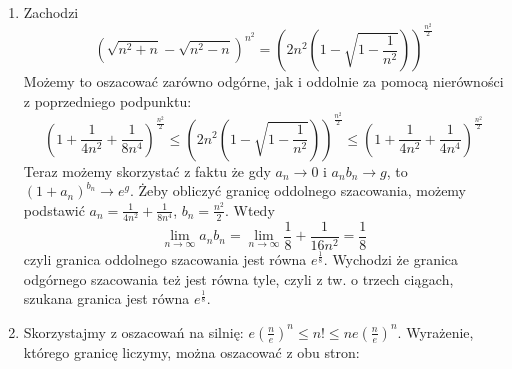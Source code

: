 \documentclass{../note}
\begin{document}
\begin{rozwiazanie}
\begin{enumerate}[label=(\alph*)]
    \[1 - \frac{x}{2} - \frac{x^2}{8} - \frac{x^3}{8} \leq \sqrt{1 - x} \leq 1 - \frac{x}{2} - \frac{x^2}{8} - \frac{x^3}{16}\]
    Można to sprawdzić podnosząc stronami do kwadratu. Zachodzi:
    \[\lim_{n\to\infty} \left(e^{\sqrt{n+1}-\sqrt{n-1}}-1\right)^{2} \left(1+\sqrt{2}+\sqrt[3]{3}+\dots+\sqrt[n]{n}\right) =\]
    \[\lim_{n\to\infty} \left(\sqrt{n+1}-\sqrt{n-1}\right)^2 \left(\frac{e^{\sqrt{n+1}-\sqrt{n-1}}-1}{\sqrt{n+1}-\sqrt{n-1}}\right)^2 \left(1+\sqrt{2}+\sqrt[3]{3}+\dots+\sqrt[n]{n}\right) =\]
    \[\lim_{n\to\infty} 2n\left(1 - \sqrt{1 - \frac{1}{n^2}}\right) \left(1+\sqrt{2}+\sqrt[3]{3}+\dots+\sqrt[n]{n}\right)\]
    Pierwszą część powyższej granicy możemy szacować zarówno odgórnie, jak i oddolnie. Zauważmy, że te szacowania są asymptotycznie równe:
    \[\lim_{n\to\infty} \frac{2n\left(\frac{1}{2n^2} + \frac{1}{8n^4} + \frac{1}{8n^6}\right)}{2n \frac{1}{2n^2}} = \lim_{n\to\infty} 1 + \frac{1}{4n^2} + \frac{1}{4n^4} = 1\]
    Z tego i z tw. o trzech ciągach wynika, że ta pierwsza część jest asymptotycznie równa swoim szacowaniom. Tak więc granica, którą liczymy, jest równa
    \[\lim_{n\to\infty} \frac1n \left(1+\sqrt{2}+\sqrt[3]{3}+\dots+\sqrt[n]{n}\right)\]
    Zauważmy, że zachodzą warunki twierdzenia Stolza-Cezaro dla \[a_n = 1+\sqrt{2}+\sqrt[3]{3}+\dots+\sqrt[n]{n}, \hspace{5pt}b_n = n\]
    Możemy więc równie dobrze obliczyć taką granicę:
    \[\lim_{n\to\infty} \frac{\sqrt[n+1]{n+1}}{n+1-n} = \lim_{n\to\infty} \sqrt[n]{n} = 1\]
    \item Zachodzi
    \[\left(\sqrt{n^{2}+n}-\sqrt{n^{2}-n}\right)^{n^{2}} = \left(2n^2\left(1 - \sqrt{1 - \frac1{n^2}}\right)\right)^{\frac{n^{2}}{2}}\]
    Możemy to oszacować zarówno odgórne, jak i oddolnie za pomocą nierówności z poprzedniego podpunktu:
    \[\left(1 + \frac{1}{4n^2} + \frac{1}{8n^4}\right)^{\frac{n^{2}}{2}} \leq \left(2n^2\left(1 - \sqrt{1 - \frac1{n^2}}\right)\right)^{\frac{n^{2}}{2}} \leq \left(1 + \frac{1}{4n^2} + \frac{1}{4n^4}\right)^{\frac{n^{2}}{2}}\]
    Teraz możemy skorzystać z faktu że gdy $a_n \to 0$ i $a_nb_n \to g$, to $(1 + a_n)^{b_n} \to e^g$. Żeby obliczyć granicę oddolnego szacowania, możemy podstawić $a_n = \frac{1}{4n^2} + \frac{1}{8n^4}$, $b_n = \frac{n^{2}}{2}$. Wtedy
    \[\lim_{n\to\infty} a_nb_n = \lim_{n\to\infty} \frac18 + \frac{1}{16n^2} = \frac18\]
    czyli granica oddolnego szacowania jest równa $e^{\frac18}$. Wychodzi że granica odgórnego szacowania też jest równa tyle, czyli z tw. o trzech ciągach, szukana granica jest równa $e^{\frac18}$.
    \item Skorzystajmy z oszacowań na silnię: $e\left(\frac{n}{e}\right)^n \leq n! \leq ne\left(\frac{n}{e}\right)^n$. Wyrażenie, którego granicę liczymy, można oszacować z obu stron:

\end{enumerate}
\end{rozwiazanie}
\end{document}
